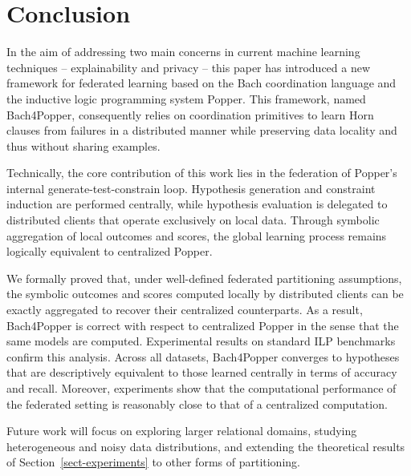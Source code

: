 \section{Conclusion}
\label{sect-conclusion}
In the aim of addressing two main concerns in current machine learning techniques -- explainability and privacy -- this paper has introduced a new framework for federated learning based on the Bach coordination language and the inductive logic programming system Popper. This framework, named Bach4Popper, consequently relies on coordination primitives to learn Horn clauses from failures in a distributed manner while preserving data locality and thus without sharing examples.

Technically, the core contribution of this work lies in the federation of Popper’s internal generate-test-constrain loop. Hypothesis generation and constraint induction are performed centrally, while hypothesis evaluation is delegated to distributed clients that operate exclusively on local data. Through symbolic aggregation of local outcomes and scores, the global learning process remains logically equivalent to centralized Popper.

We formally proved that, under well-defined federated partitioning assumptions, the symbolic outcomes and scores computed locally by distributed clients can be exactly aggregated to recover their centralized counterparts.
As a result, Bach4Popper is correct with respect to centralized Popper in the sense that the same models are computed. Experimental results on standard ILP benchmarks confirm this analysis. Across all datasets, Bach4Popper converges to hypotheses that are descriptively equivalent to those learned centrally in terms of accuracy and recall. Moreover, experiments show that the computational performance of the federated setting is reasonably close to that of a centralized computation.

Future work will focus on exploring larger relational domains, studying heterogeneous and noisy data distributions, and extending the theoretical results of Section~\ref{sect-experiments} to other forms of partitioning.


